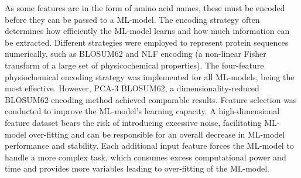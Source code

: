 \documentclass[12pt]{article}
\begin{document}
As some features are in the form of amino acid names, these must be
encoded before they can be passed to a ML-model. The
encoding strategy often determines how efficiently the ML-model learns
and how much information can be extracted. Different strategies were
employed to represent protein sequences numerically, such as BLOSUM62\cite{Henikoff1992} and NLF\cite{Nanni2011} encoding (a non-linear Fisher transform of a large set of physicochemical properties). The four-feature physiochemical encoding strategy\cite{Abhinandan2010} was implemented for all ML-models, being
the most effective. However, PCA-3 BLOSUM62, a dimensionality-reduced
BLOSUM62 encoding method achieved comparable results.
Feature selection was conducted to improve the ML-model's learning
capacity. A high-dimensional feature dataset bears the risk of
introducing excessive noise, facilitating ML-model over-fitting and can be
responsible for an overall decrease in ML-model performance and
stability. Each additional input feature forces the ML-model to
handle a more complex task, which consumes excess computational power
and time and provides more variables leading to over-fitting of the ML-model.
\end{document}
